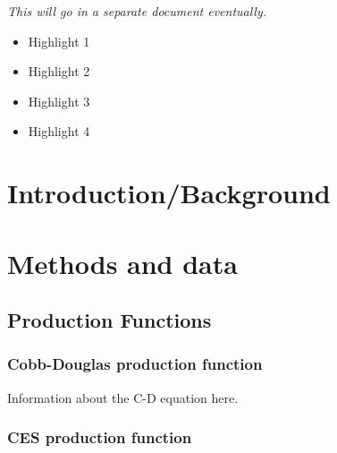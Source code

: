 \documentclass[preprint,10pt,3p]{elsarticle}\usepackage[]{graphicx}\usepackage[]{color}
\begin{document}
\emph{This will go in a separate document eventually.}

\begin{itemize}
\item Highlight 1
\item Highlight 2
\item Highlight 3
\item Highlight 4
\end{itemize}



\section{Introduction/Background}
\label{sec:intro}



\section{Methods and data}
\label{sec:methods}



\subsection{Production Functions}	%
\label{sec:models}


\subsubsection{Cobb-Douglas production function}
\label{sec:CD}

Information about the C-D equation here.


\subsubsection{CES production function}
\label{sec:CES}
\end{document}
